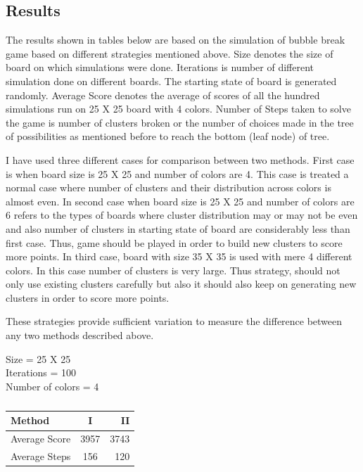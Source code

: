 \documentclass[twoside]{article}
\begin{document}
\begin{multicols}{2}
\section{Results}

The results shown in tables below are based on the simulation of bubble break game based on different strategies mentioned above. 
Size denotes the size of board on which simulations were done. Iterations is number of different simulation done on different 
boards. The starting state of board is generated randomly.
Average Score denotes the average of scores of all the hundred simulations run on 25 X 25 board with 4 colors. Number of Steps 
taken to solve the game is number of clusters broken or the number of choices made in the tree of possibilities as mentioned before
to reach the bottom (leaf node) of tree.

I have used three different cases for comparison between two methods. First case is when board size is 25 X 25 and number of colors 
are 4. This case is treated a normal case where number of clusters and their distribution across colors is almost even. In second 
case when board size is 25 X 25 and number of colors are 6 refers to the types of boards where cluster distribution may or may not 
be even and also number of clusters in starting state of board are considerably less than first case. Thus, game should be played in
order to build new clusters to score more points. In third case, board with size 35 X 35 is used with mere 4 different colors. 
In this case number of clusters is very large. Thus strategy, should not only use existing clusters carefully but also it should 
also keep on generating new clusters in order to score more points. 

These strategies provide sufficient variation to measure the difference between any two methods described above.

\begin{table}[H]
\caption{}
\centering
Size = 25 X 25	\\
Iterations = 100\\
Number of colors = 4	\\

\begin{tabular}{l | c | r}
\toprule
Method & I & II \\
\hline
Average Score & 3957 & 3743 \\
\hline
Average Steps & 156 & 120 \\
\hline
\bottomrule
\end{tabular}
\end{table}


\end{multicols}
\end{document}
